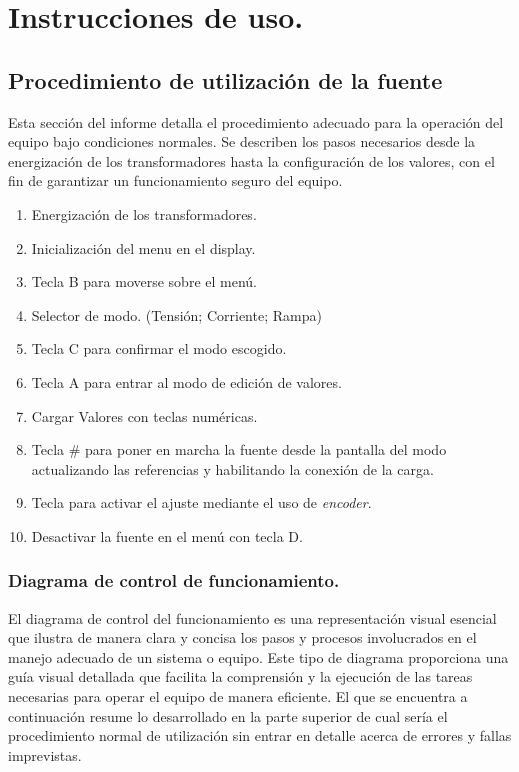 \chapter{Instrucciones de uso.}

\label{C:Forma de operar la fuente DC}

\section{Procedimiento de utilización de la fuente}

Esta sección del informe detalla el procedimiento adecuado para la operación del equipo bajo condiciones normales. Se describen los pasos necesarios desde la energización de los transformadores hasta la configuración de los valores, con el fin de garantizar un funcionamiento seguro del equipo.\par 

\begin{enumerate}
    \item Energización de los transformadores.
    \item Inicialización del menu en el display.
    \item Tecla B para moverse sobre el menú.
    \item Selector de modo. (Tensión; Corriente; Rampa)
    \item Tecla C para confirmar el modo escogido.
    \item Tecla A para entrar al modo de edición de valores.
    \item Cargar Valores con teclas numéricas.
    \item Tecla \# para poner en marcha la fuente desde la pantalla del modo actualizando las referencias y habilitando la conexión de la carga.
    \item Tecla \* para activar el ajuste mediante el uso de \textit{encoder}.
    \item Desactivar la fuente en el menú con tecla D.
\end{enumerate}

\subsection{Diagrama de control de funcionamiento.}

El diagrama de control del funcionamiento es una representación visual esencial que ilustra de manera clara y concisa los pasos y procesos involucrados en el manejo adecuado de un sistema o equipo. Este tipo de diagrama proporciona una guía visual detallada que facilita la comprensión y la ejecución de las tareas necesarias para operar el equipo de manera eficiente. El que se encuentra a continuación resume lo desarrollado en la parte superior de cual sería el procedimiento normal de utilización sin entrar en detalle acerca de errores y fallas imprevistas. 

